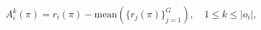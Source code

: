 \begin{equation}
A_i^k(\pi) = r_i(\pi) - \text{mean}\left(\{r_j(\pi)\}_{j=1}^G\right), \quad 1 \leq k \leq |o_i|,
\label{eq:grpo-advantage}
\end{equation}